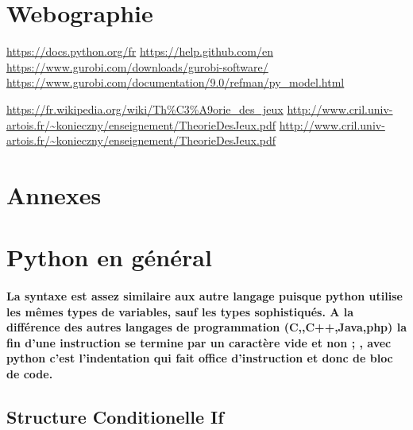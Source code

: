 \documentclass[a4paper, 12pt, twoside]{article}
\begin{document}
\section{Webographie}
\begin{thebibliography}{2}
    \url{https://docs.python.org/fr}\newline
   \url{https://help.github.com/en}\newline
   \url{ https://www.gurobi.com/downloads/gurobi-software/}\newline
   \url{ https://www.gurobi.com/documentation/9.0/refman/py_model.html}\newline
  
   \url{https://fr.wikipedia.org/wiki/Th\%C3\%A9orie_des_jeux}\newline
   \url{http://www.cril.univ-artois.fr/~konieczny/enseignement/TheorieDesJeux.pdf}\newline
   \url{http://www.cril.univ-artois.fr/~konieczny/enseignement/TheorieDesJeux.pdf}\newline
  
\end{thebibliography}



\newpage
\section{Annexes}
\appendix
\makeatletter
\def\@seccntformat#1{Annexe~\csname the#1\endcsname:\quad}
\makeatother
\section{Python en général}
\paragraph{La syntaxe est assez similaire aux autre langage puisque python utilise les mêmes types de variables, sauf les types sophistiqués. A la différence des autres langages de programmation (C,,C++,Java,php) la fin d'une instruction se termine par un caractère vide
et non  ; , avec python c'est l'indentation qui fait office d'instruction et donc de bloc de code.}
\subsection{ Structure Conditionelle If }
\end{document}
